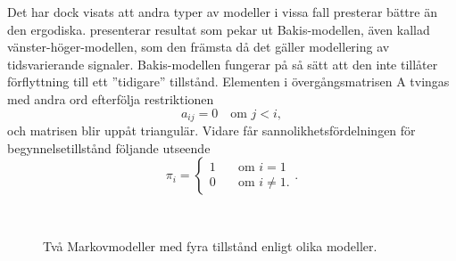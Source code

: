 \documentclass[../rapport_MVEX01-11-05]{subfiles}
\begin{document}
Det har dock visats att andra typer av modeller i vissa fall presterar
bättre än den ergodiska. 
presenterar resultat som pekar ut Bakis-modellen, även kallad
vänster-höger-modellen, som den främsta då det gäller modellering
av tidsvarierande signaler. Bakis-modellen fungerar på så sätt att den
inte tillåter förflyttning till ett ''tidigare'' tillstånd. Elementen i
övergångsmatrisen A tvingas med andra ord efterfölja restriktionen
\begin{equation*}
a_{ij} = 0 \quad\text{om }j<i,
\end{equation*}
och matrisen blir uppåt triangulär.
Vidare får sannolikhetsfördelningen för begynnelsetillstånd följande
utseende
\begin{equation*}
\pi_i = \begin{cases}
         1 & \quad\text{om } i = 1\\
         0 & \quad\text{om } i \neq 1.\end{cases}.
\end{equation*}  

\begin{figure}[tb]
  \centering
	\\[2em]
  \caption{Två Markovmodeller med fyra tillstånd enligt olika modeller.}
  \label{fig:hmm-lr-lrb}
\end{figure}
\end{document}
